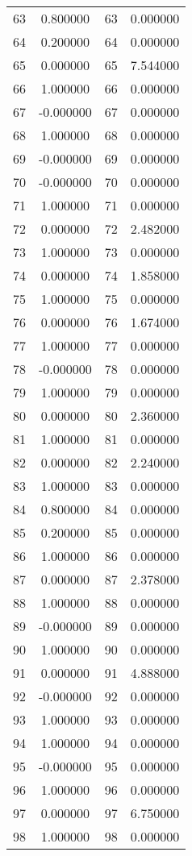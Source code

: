 \documentclass[12pt]{article}
\begin{document}
\begin{longtable}{@{}cccc@{}}
63 & 0.800000 & 63 & 0.000000 \\
64 & 0.200000 & 64 & 0.000000 \\
65 & 0.000000 & 65 & 7.544000 \\
66 & 1.000000 & 66 & 0.000000 \\
67 & -0.000000 & 67 & 0.000000 \\
68 & 1.000000 & 68 & 0.000000 \\
69 & -0.000000 & 69 & 0.000000 \\
70 & -0.000000 & 70 & 0.000000 \\
71 & 1.000000 & 71 & 0.000000 \\
72 & 0.000000 & 72 & 2.482000 \\
73 & 1.000000 & 73 & 0.000000 \\
74 & 0.000000 & 74 & 1.858000 \\
75 & 1.000000 & 75 & 0.000000 \\
76 & 0.000000 & 76 & 1.674000 \\
77 & 1.000000 & 77 & 0.000000 \\
78 & -0.000000 & 78 & 0.000000 \\
79 & 1.000000 & 79 & 0.000000 \\
80 & 0.000000 & 80 & 2.360000 \\
81 & 1.000000 & 81 & 0.000000 \\
82 & 0.000000 & 82 & 2.240000 \\
83 & 1.000000 & 83 & 0.000000 \\
84 & 0.800000 & 84 & 0.000000 \\
85 & 0.200000 & 85 & 0.000000 \\
86 & 1.000000 & 86 & 0.000000 \\
87 & 0.000000 & 87 & 2.378000 \\
88 & 1.000000 & 88 & 0.000000 \\
89 & -0.000000 & 89 & 0.000000 \\
90 & 1.000000 & 90 & 0.000000 \\
91 & 0.000000 & 91 & 4.888000 \\
92 & -0.000000 & 92 & 0.000000 \\
93 & 1.000000 & 93 & 0.000000 \\
94 & 1.000000 & 94 & 0.000000 \\
95 & -0.000000 & 95 & 0.000000 \\
96 & 1.000000 & 96 & 0.000000 \\
97 & 0.000000 & 97 & 6.750000 \\
98 & 1.000000 & 98 & 0.000000 \\

\end{longtable}
\end{document}
